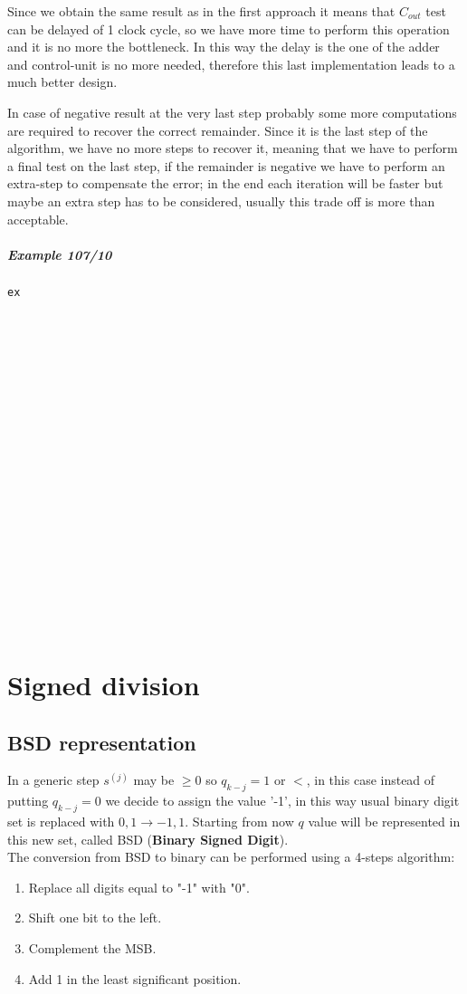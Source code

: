 Since we obtain the same result as in the first approach it means that $C_{out}$ test can be delayed of 1 clock cycle, so we have more time to perform this operation and it is no more the bottleneck. In this way the delay is the one of the adder and control-unit is no more needed, therefore this last implementation leads to a much better design.

In case of negative result at the very last step probably some more computations are required to recover the correct remainder. Since it is the last step of the algorithm, we have no more steps to recover it, meaning that we have to perform a final test on the last step, if the remainder is negative we have to perform an extra-step to compensate the error; in the end each iteration will be faster but maybe an extra step has to be considered, usually this trade off is more than acceptable.

\subparagraph{Example 107/10}

\begin{verbatim}
ex























\end{verbatim}

\section{Signed division}

\subsection{BSD representation}
In a generic step $s^{(j)}$ may be $\geq 0$ so  $q_{k-j}=1$ or $<$, in this case instead of putting $q_{k-j}=0$ we decide to assign the value '-1', in this way usual binary digit set is replaced with ${0,1} \rightarrow {-1, 1}$. Starting from now $q$ value will be represented in this new set, called BSD (\textbf{Binary Signed Digit}).\\

The conversion from BSD to binary can be performed using a 4-steps algorithm:
\begin{enumerate}
  \item Replace all digits equal to "-1" with "0".
  \item Shift one bit to the left.
  \item Complement the MSB.
  \item Add 1 in the least significant position.
\end{enumerate}

